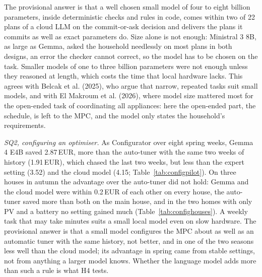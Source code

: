 \documentclass[12pt,a4paper]{report}
\begin{document}
The provisional answer is that a well chosen small model of four to
eight billion parameters, inside deterministic checks and rules in
code, comes within two of 22 plans of a cloud LLM on the commit-or-ask
decision and delivers the plans it commits as well as exact parameters
do. Size alone is not enough: Ministral 3 8B, as large as Gemma, asked
the household needlessly on most plans in both designs, an error the
checker cannot correct, so the model has to be chosen on the task.
Smaller models of one to three billion parameters were not enough
unless they reasoned at length, which costs the time that local
hardware lacks. This agrees with Belcak et al. (2025), who argue that
narrow, repeated tasks suit small models, and with
El Makroum et al. (2026), where model size mattered most for the
open-ended task of coordinating all appliances: here the open-ended
part, the schedule, is left to the MPC, and the model only states the
household's requirements.

\textit{SQ2, configuring an optimiser.} As Configurator over eight
spring weeks, Gemma 4 E4B saved 2.87\,EUR, more than the auto-tuner
with the same two weeks of history (1.91\,EUR), which chased the last
two weeks, but less than the expert setting (3.52) and the cloud model
(4.15; Table~\ref{tab:configpilot}). On three houses in autumn the
advantage over the auto-tuner did not hold: Gemma and the cloud model
were within 0.2\,EUR of each other on every house, the auto-tuner saved
more than both on the main house, and in the two homes with only PV and
a battery no setting gained much (Table~\ref{tab:confighouses}). A
weekly task that may take minutes suits a small local model even on
slow hardware. The provisional answer is that a small model configures
the MPC about as well as an automatic tuner with the same history, not
better, and in one of the two seasons less well than the cloud model;
its advantage in spring came from stable settings, not from anything a
larger model knows. Whether the language model adds more than such a
rule is what H4 tests.
\end{document}

